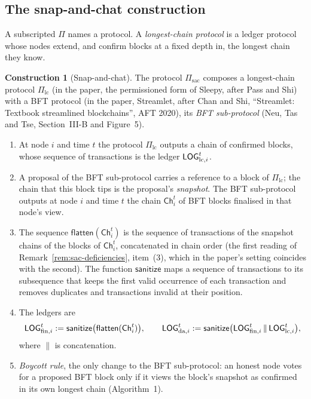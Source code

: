 \documentclass[11pt,a4paper]{article}
\theoremstyle{definition}
\newtheorem{construction}[theorem]{Construction}
\newcommand{\Pilc}{\Pi_{\mathrm{lc}}}
\newcommand{\Pisac}{\Pi_{\mathrm{sac}}}
\newcommand{\sanitize}{\mathsf{sanitize}}
\newcommand{\flatten}{\mathsf{flatten}}
\newcommand{\Ch}{\mathsf{Ch}}
\begin{document}
\subsection{The snap-and-chat construction}\label{sec:model-sac}

A subscripted $\Pi$ names a protocol. A \emph{longest-chain protocol} is a
ledger protocol whose nodes extend, and confirm blocks at a fixed depth in,
the longest chain they know.

\begin{construction}[Snap-and-chat]\label{def:sac}
The protocol $\Pisac$ composes a longest-chain protocol $\Pilc$ (in the
paper, the permissioned form of Sleepy, after Pass and Shi) with a BFT
protocol (in the paper, Streamlet, after Chan and Shi, ``Streamlet: Textbook
streamlined blockchains'', AFT 2020), its \emph{BFT sub-protocol}
(Neu, Tas and Tse, Section~III-B and Figure~5).
\begin{enumerate}[label=(\roman*)]
\item At node $i$ and time $t$ the protocol $\Pilc$ outputs a chain of
  confirmed blocks, whose sequence of transactions is the ledger
  $\LOGlc[i]^t$.
\item A proposal of the BFT sub-protocol carries a reference to a block of
  $\Pilc$; the chain that this block tips is the proposal's
  \emph{snapshot}. The BFT sub-protocol outputs at node $i$ and time $t$ the
  chain $\Ch_i^t$ of BFT blocks finalised in that node's view.
\item The sequence $\flatten(\Ch_i^t)$ is the sequence of transactions of
  the snapshot chains of the blocks of $\Ch_i^t$, concatenated in chain order
  (the first reading of Remark~\ref{rem:sac-deficiencies}, item~(3), which in
  the paper's setting coincides with the second). The function $\sanitize$ maps
  a sequence of transactions to its subsequence that keeps the first valid
  occurrence of each transaction and removes duplicates and transactions
  invalid at their position.
\item The ledgers are
  \begin{gather*}
    \LOGfin[i]^t := \sanitize\bigl(\flatten(\Ch_i^t)\bigr), \qquad
    \LOGda[i]^t := \sanitize\bigl(\LOGfin[i]^t \,\|\, \LOGlc[i]^t\bigr),
  \end{gather*}
  where $\|$ is concatenation.
\item \emph{Boycott rule}, the only change to the BFT sub-protocol: an
  honest node votes for a proposed BFT block only if it views the block's
  snapshot as confirmed in its own longest chain (Algorithm~1).
\end{enumerate}
\end{construction}
\end{document}
